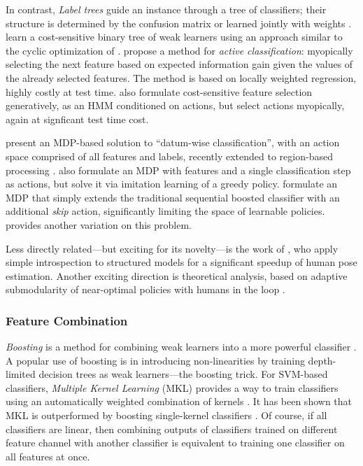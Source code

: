 In contrast, \emph{Label trees} guide an instance through a tree of classifiers; their structure is determined by the confusion matrix or learned jointly with weights \parencite{Deng-NIPS-2011}.
\cite{Xu-ICML-2013} learn a cost-sensitive binary tree of weak learners using an approach similar to the cyclic optimization of \parencite{Chen-AISTATS-2012}.
\cite{Gao-NIPS-2011} propose a method for \emph{active classification}: myopically selecting the next feature based on expected information gain given the values of the already selected features.
The method is based on locally weighted regression, highly costly at test time.
\cite{Ji-PR-2007} also formulate cost-sensitive feature selection generatively, as an HMM conditioned on actions, but select actions myopically, again at signficant test time cost.

\cite{DulacArnold-ML-2012} present an MDP-based solution to ``datum-wise classification'', with an action space comprised of all features and labels, recently extended to region-based processing \parencite{DulacArnold-ICLR-2014}.
\cite{HeHe-ICMLW-2012} also formulate an MDP with features and a single classification step as actions, but solve it via imitation learning of a greedy policy.
\cite{Benbouzid-ICML-2012} formulate an MDP that simply extends the traditional sequential boosted classifier with an additional \emph{skip} action, significantly limiting the space of learnable policies.
\cite{Trapeznikov-ML-2012} provides another variation on this problem.

Less directly related---but exciting for its novelty---is the work of \parencite{Weiss-ICCV-2013}, who apply simple introspection to structured models for a significant speedup of human pose estimation.
Another exciting direction is theoretical analysis, based on adaptive submodularity \parencite{Golovin-and-Krause-2010-JAIR} of near-optimal policies with humans in the loop \parencite{Chen-2014-ICML}.

\subsubsection{Feature Combination}

\emph{Boosting} is a method for combining weak learners into a more powerful classifier \parencite{Hastie2009}.
A popular use of boosting is in introducing non-linearities by training depth-limited decision trees as weak learners---the boosting trick.
For SVM-based classifiers, \emph{Multiple Kernel Learning} (MKL) provides a way to train classifiers using an automatically weighted combination of kernels \parencite{Lanckriet2004}.
It has been shown that MKL is outperformed by boosting single-kernel classifiers \parencite{Gehler2009}.
Of course, if all classifiers are linear, then combining outputs of classifiers trained on different feature channel with another classifier is equivalent to training one classifier on all features at once.

